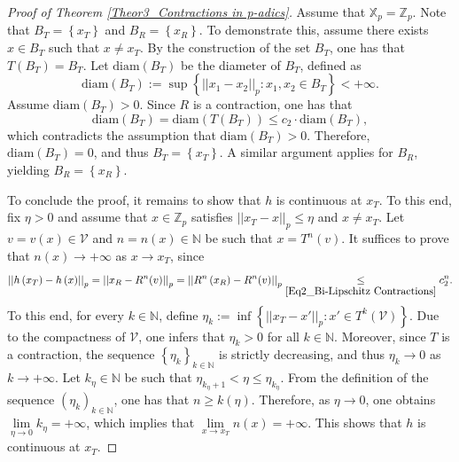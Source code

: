 \documentclass[a4paper, 12pt]{article}
\theoremstyle{definition}
\begin{document}
\begin{proof}[Proof of Theorem \ref{Theor3_Contractions in p-adics}]
		Assume that $\mathbb{X}_{p} = \mathbb{Z}_{p}$. 
		Note that $B_{T} =  \left\{  x_{T}  \right\} $ and $B_{R} =  \left\{  x_{R}  \right\} $. To demonstrate this, assume there exists $x \in B_{T}$ such that $x \neq x_{T}$. By the construction of the set $B_{T}$, one has that $T \left(  B_{T}  \right)  = B_{T}$. Let $\textrm{diam} \left(  B_{T}  \right) $ be the diameter of $ B_{T}$, defined as   
		$$ \textrm{diam} \left(  B_{T}  \right)  :=   \sup \left\{   \left| \left|  x_{1} - x_{2}  \right|  \right|_{p} :   x_{1}, x_{2} \in B_{T}  \right\}    <   + \infty  .$$
		Assume $\textrm{diam} \left(  B_{T}  \right)   > 0$. Since $R$ is a contraction, one has that 
		$$ \textrm{diam} \left(  B_{T}  \right)    =   \textrm{diam} \left(  T \left(  B_{T}  \right)   \right)     \le   c_{2} \cdot \textrm{diam} \left(  B_{T}  \right)  ,$$
		which contradicts the assumption that $\textrm{diam} \left(  B_{T}  \right)   > 0$. Therefore, $\textrm{diam} \left(  B_{T}  \right)  =0$, and thus $ B_{T}  =  \left\{  x_{T}  \right\} $. 
		A similar argument applies for $B_{R}$, yielding $B_{R} =  \left\{  x_{R}  \right\} $. 
		
		
		To conclude the proof, it remains to show that $h$ is continuous at $x_{T}$. 
		To this end, fix $ \eta  > 0$ and assume that $x \in \mathbb{Z}_{p}$ satisfies $ \left| \left|  x_{T} - x  \right|  \right|_{p} \le  \eta $ and $x \neq x_{T}$. Let $v = v \left(  x  \right)  \in \mathcal{V} $ and $n = n \left(  x  \right)  \in \mathbb{N} $ be such that $x = T^{n}(v)$. 
		It suffices to prove that $n \left(  x  \right)  \to + \infty $ as $x \to x_{T}$, since
		\begin{equation}\label{Eq2_Fixed Point Continuity}
			\left| \left|  h \left(  x_{T}  \right)  - h \left(  x  \right)   \right|  \right|_{p}   =    \left| \left|  x_{R} - R^{n}(v)  \right|  \right|_{p}    =    \left| \left|  R^{n} \left(  x_{R}  \right)  - R^{n}(v)  \right|  \right|_{p}   \underset{\eqref{Eq2_Bi-Lipschitz Contractions}}{\le}   c_{2}^{n} . 
		\end{equation}
		To this end, for every $k \in \mathbb{N} $, define $\eta_{k} := \inf  \left\{   \left| \left|  x_{T} - x'  \right|  \right|_{p} :   x' \in T^{k} \left(  \mathcal{V}  \right)   \right\} $.
		Due to the compactness of $\mathcal{V}$, one infers that $\eta_{k}  > 0$ for all $k \in \mathbb{N} $.
		Moreover, since $T$ is a contraction, the sequence $ \left\{  \eta_{k}  \right\}_{k \in  \mathbb{N} }$ is strictly decreasing, and thus $\eta_{k} {\longrightarrow} 0$ as $k \to + \infty $. 
		Let $k_{ \eta} \in \mathbb{N} $ be such that $\eta_{k_{ \eta} + 1}  <  \eta \le \eta_{k_{ \eta}} $. From the definition of the sequence $ \left(  \eta_{k}   \right)_{k \in  \mathbb{N} }$, one has that $n \ge k \left(   \eta  \right)  $. 
		Therefore, as $ \eta \to 0$, one obtains $\underset{ \eta \to 0}{\lim} k_{ \eta} = + \infty $, which implies that $\underset{ x \to x_{T} }{\lim} n(x) = + \infty $. 
		This shows that $h$ is continuous at $x_{T}$. 
		

\end{proof}
\end{document}
